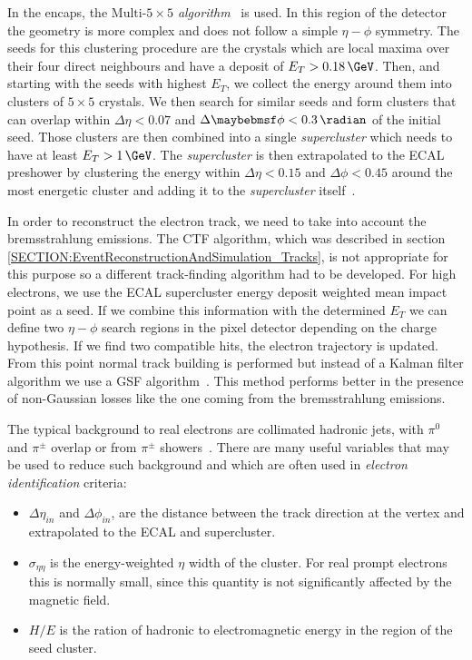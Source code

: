 In the encaps, the \textit{$\text{Multi-}5 \times 5$ algorithm}~\cite{ARTICLE:CMSElectronReconstruction8TeV} is used. In this region of the detector the geometry is more complex and does not follow a simple $\eta-\phi$ symmetry. The seeds for this clustering procedure are the crystals which are local maxima over their four direct neighbours and have a deposit of $E_T>0.18\,\GeV$. Then, and starting with the seeds with highest $E_T$, we collect the energy around them into clusters of $5 \times 5$ crystals. We then search for similar seeds and form clusters that can overlap within $\Delta\eta<0.07$ and $\Delta\phi<0.3\,\radian$ of the initial seed. Those clusters are then combined into a single \textit{supercluster} which needs to have at least $E_T>1\,\GeV$. The \textit{supercluster} is then extrapolated to the \gls{ECAL} preshower by clustering the energy within $\Delta\eta<0.15$ and $\Delta\phi<0.45$ around the most energetic cluster and adding it to the \textit{supercluster} itself~\cite{ARTICLE:CMSElectronReconstruction8TeV}.

In order to reconstruct the electron track, we need to take into account the bremsstrahlung emissions. The \gls{CTF} algorithm, which was described in section \ref{SECTION:EventReconstructionAndSimulation_Tracks}, is not appropriate for this purpose so a different track-finding algorithm had to be developed. For high \pt electrons, we use the \gls{ECAL} supercluster energy deposit weighted mean impact point as a seed. If we combine this information with the determined $E_T$ we can define two $\eta-\phi$ search regions in the pixel detector depending on the charge hypothesis. If we find two compatible hits, the electron trajectory is updated. From this point normal track building is performed but instead of a Kalman filter algorithm we use a \gls{GSF} algorithm~\cite{ARTICLE:CMSReconstructionElectronsGSF}. This method performs better in the presence of non-Gaussian losses like the one coming from the bremsstrahlung emissions.

The typical background to real electrons are collimated hadronic jets, with $\pi^0$ and $\pi^{\pm}$ overlap or from $\pi^{\pm}$ showers~\cite{ARTICLE:CMSElectronReconstruction}. There are many useful variables that may be used to reduce such background and which are often used in \textit{electron identification} criteria:

\begin{itemize}
  \item $\Delta\eta_{in}$ and $\Delta\phi_{in}$, are the distance between the track direction at the vertex and extrapolated to the \gls{ECAL} and supercluster.
  \item $\sigma_{\eta\eta}$ is the energy-weighted $\eta$ width of the cluster. For real prompt electrons this is normally small, since this quantity is not significantly affected by the magnetic field.
  \item $H/E$ is the ration of hadronic to electromagnetic energy in the region of the seed cluster. 
\end{itemize}

